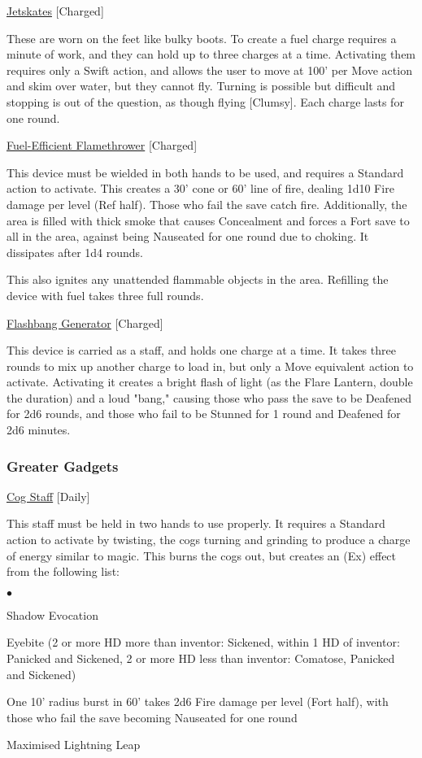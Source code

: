 \medskip\noindent\underline{Jetskates} [Charged]

\noindent These are worn on the feet like bulky boots. To create a fuel charge requires a minute of work, and they can hold up to three charges at a time. Activating them requires only a Swift action, and allows the user to move at 100' per Move action and skim over water, but they cannot fly. Turning is possible but difficult and stopping is out of the question, as though flying [Clumsy]. Each charge lasts for one round.

\medskip\noindent\underline{Fuel-Efficient Flamethrower} [Charged]

\noindent This device must be wielded in both hands to be used, and requires a Standard action to activate. This creates a 30' cone or 60' line of fire, dealing 1d10 Fire damage per level (Ref half). Those who fail the save catch fire. Additionally, the area is filled with thick smoke that causes Concealment and forces a Fort save to all in the area, against being Nauseated for one round due to choking. It dissipates after 1d4 rounds.

\smallskip\noindent This also ignites any unattended flammable objects in the area. Refilling the device with fuel takes three full rounds.

\medskip\noindent\underline{Flashbang Generator} [Charged]

\noindent This device is carried as a staff, and holds one charge at a time. It takes three rounds to mix up another charge to load in, but only a Move equivalent action to activate. Activating it creates a bright flash of light (as the Flare Lantern, double the duration) and a loud "bang," causing those who pass the save to be Deafened for 2d6 rounds, and those who fail to be Stunned for 1 round and Deafened for 2d6 minutes.

\subsubsection{Greater Gadgets}

\noindent\underline{Cog Staff} [Daily]

\noindent This staff must be held in two hands to use properly. It requires a Standard action to activate by twisting, the cogs turning and grinding to produce a charge of energy similar to magic. This burns the cogs out, but creates an (Ex) effect from the following list:

\begin{list}{$\bullet$}{\itemspace}
\item Shadow Evocation
\item Eyebite (2 or more HD more than inventor: Sickened, within 1 HD of inventor: Panicked and Sickened, 2 or more HD less than inventor: Comatose, Panicked and Sickened)
\item One 10' radius burst in 60' takes 2d6 Fire damage per level (Fort half), with those who fail the save becoming Nauseated for one round
\item Maximised Lightning Leap
\end{list}

